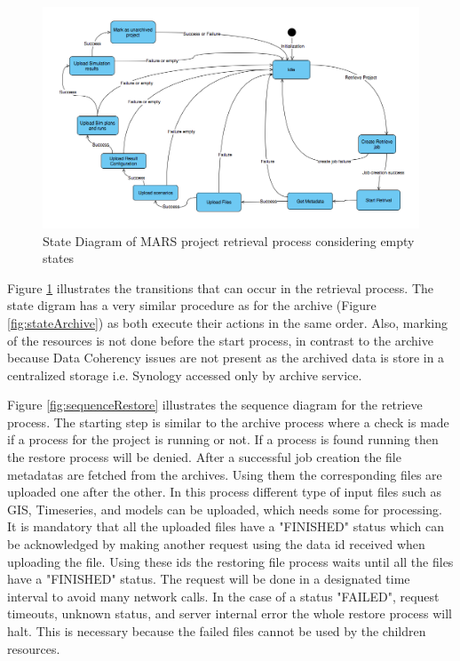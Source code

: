     \begin{figure}[H]
        \centering \includegraphics[scale=0.45]{grafiken/stateRestore.png}
        \caption{State Diagram of MARS project retrieval process considering empty states}
        \label{fig:stateRestore}
    \end{figure}

    Figure \ref{fig:stateRestore} illustrates the transitions that can occur in the retrieval process. The state digram has a very similar procedure as for the
    archive (Figure \ref{fig:stateArchive}) as both execute their actions in the same order. 
    Also, marking of the resources is not done before the start process, in contrast to the archive because Data Coherency issues are not present as the archived
    data is store in a centralized storage i.e. Synology accessed only by archive service.   

Figure \ref{fig:sequenceRestore} illustrates the sequence diagram for the retrieve process. The starting step is similar to the archive process where a
check is made if a process for the project is running or not. If a process is found running then the restore process will be denied. After a
successful job creation the file metadatas are fetched from the archives. Using them the corresponding files are uploaded one after the other. 
In this process different type of input files such as GIS, Timeseries, and models can be uploaded, which needs some for processing. It is mandatory
that all the uploaded files have a "FINISHED" status which can be acknowledged by making another request using the data id received when uploading the file. 
Using these ids the restoring file process waits until all the files have a "FINISHED" status. The request will be done in a designated time interval to avoid many
network calls. In the case of a status "FAILED", request timeouts, unknown status, and server internal error the whole restore process will halt. 
This is necessary because the failed files cannot be used by the children resources.


